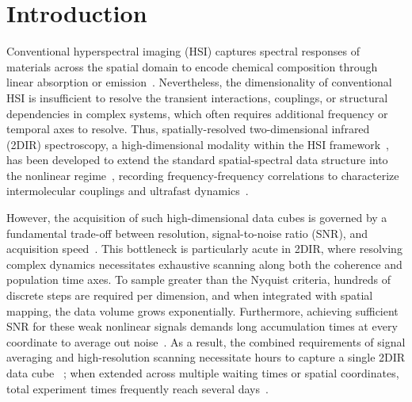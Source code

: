 \documentclass{optica-article}
\begin{document}
\section{Introduction}
\label{sec:intro}

Conventional hyperspectral imaging (HSI) captures spectral responses of materials across the spatial domain to encode chemical composition through linear absorption or emission~\cite{goetz1985imaging, chang2003hyperspectral}. Nevertheless, the dimensionality of conventional HSI is insufficient to resolve the transient interactions, couplings, or structural dependencies in complex systems, which often requires additional frequency or temporal axes to resolve. Thus, spatially-resolved two-dimensional infrared (2DIR) spectroscopy, a high-dimensional modality within the HSI framework~\cite{zanni2020hyperspectral}, has been developed to extend the standard spatial-spectral data structure into the nonlinear regime~\cite{zanni2020hyperspectral,doi:10.1021/bk-2021-1398.ch006,Baiz:14}, recording frequency-frequency correlations to characterize intermolecular couplings and ultrafast dynamics~\cite{ostrander2016spatially, baiz2011ultrafast}.

However, the acquisition of such high-dimensional data cubes is governed by a fundamental trade-off between resolution, signal-to-noise ratio (SNR), and acquisition speed~\cite{hagen2013review, gehm2007single}.  This bottleneck is particularly acute in 2DIR, where resolving complex dynamics necessitates exhaustive scanning along both the coherence and population time axes. To sample greater than the Nyquist criteria, hundreds of discrete steps are required per dimension, and when integrated with spatial mapping, the data volume grows exponentially. Furthermore, achieving sufficient SNR for these weak nonlinear signals demands long accumulation times at every coordinate to average out noise~\cite{helbing2010compact}. As a result, the combined requirements of signal averaging and high-resolution scanning necessitate hours to capture a single 2DIR data cube ~\cite{ostrander2016spatially}; when extended across multiple waiting times or spatial coordinates, total experiment times frequently reach several days~\cite{bhattacharya2017accelerating}.
\end{document}
